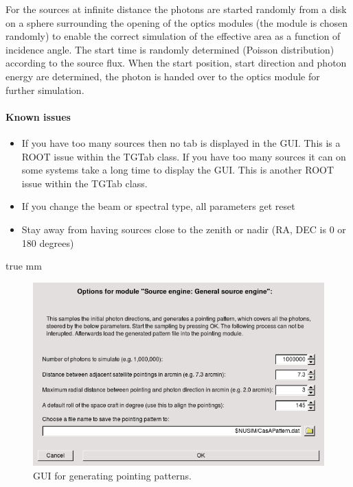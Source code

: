 For the sources at infinite distance the photons are started randomly from a disk on a sphere surrounding the opening of the optics modules (the module is chosen randomly) to enable the correct simulation of the effective area as a function of incidence angle. The start time is randomly determined (Poisson distribution) according to the source flux. When the start position, start direction and photon energy are determined, the photon is handed over to the optics module for further simulation.


\paragraph{Known issues} 

\begin{itemize}
\item If you have too many sources then no tab is displayed in the GUI. This is a ROOT issue within the TGTab class. If you have too many sources it can on some systems take a long time to display the GUI. This is another ROOT issue within the TGTab class.
\item If you change the beam or spectral type, all parameters get reset
\item Stay away from having sources close to the zenith or nadir (RA, DEC is 0 or 180 degrees) 
\end{itemize}

 true mm

\begin{figure}[tb]
\begin{center}
\includegraphics[scale=0.5]{images/pointingpatternGUI.png}  
\caption{GUI for generating pointing patterns.}
\label{pointingpatterngui} 
\end{center}
\end{figure}

